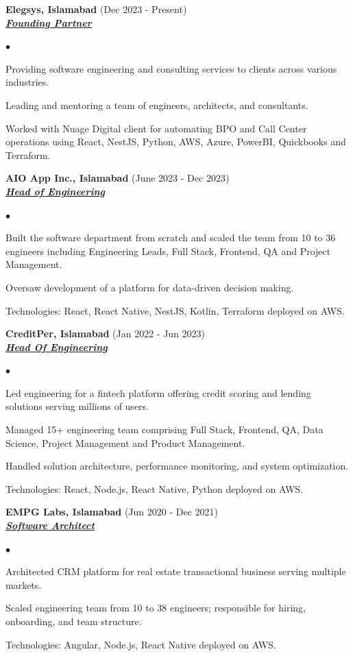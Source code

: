\documentclass{article}
\newcommand{\employer}[3]{{ \textbf{#1} (#2)\\ \underline{\textbf{\emph{#3}}}\\  }}
\newenvironment{achievements}{\begin{list}{$\bullet$}{\topsep 0pt \itemsep -2pt}}{\vspace*{4pt}\end{list}}
\begin{document}
\employer{Elegsys, Islamabad}{Dec 2023 - Present}{Founding Partner}
	\begin{achievements}
	\item Providing software engineering and consulting services to clients across various industries.
	\item Leading and mentoring a team of engineers, architects, and consultants.
	\item Worked with Nuage Digital client for automating BPO and Call Center operations using React, NestJS, Python, AWS, Azure, PowerBI, Quickbooks and Terraform.
	\end{achievements}

\employer{AIO App Inc., Islamabad}{June 2023 - Dec 2023}{Head of Engineering}
	\begin{achievements}
	\item Built the software department from scratch and scaled the team from 10 to 36 engineers including Engineering Leads, Full Stack, Frontend, QA and Project Management.
	\item Oversaw development of a platform for data-driven decision making.
	\item Technologies: React, React Native, NestJS, Kotlin, Terraform deployed on AWS.
	\end{achievements}

\employer{CreditPer, Islamabad}{Jan 2022 - Jun 2023}{Head Of Engineering}
	\begin{achievements}
	\item Led engineering for a fintech platform offering credit scoring and lending solutions serving millions of users.
	\item Managed 15+ engineering team comprising Full Stack, Frontend, QA, Data Science, Project Management and Product Management.
	\item Handled solution architecture, performance monitoring, and system optimization.
	\item Technologies: React, Node.js, React Native, Python deployed on AWS.
	\end{achievements}

\employer{EMPG Labs, Islamabad}{Jun 2020 - Dec 2021}{Software Architect}
    \begin{achievements}
    \item Architected CRM platform for real estate transactional business serving multiple markets.
    \item Scaled engineering team from 10 to 38 engineers; responsible for hiring, onboarding, and team structure.
    \item Technologies: Angular, Node.js, React Native deployed on AWS.
    \end{achievements}
\end{document}
